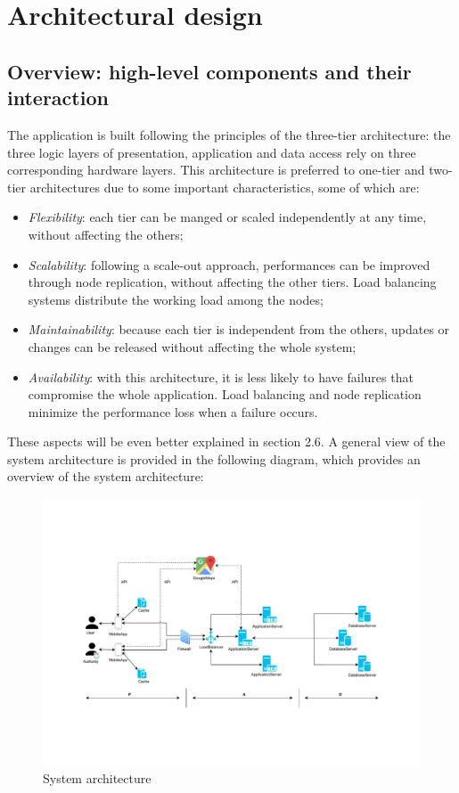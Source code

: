 \documentclass[12pt,a4paper]{report}
\begin{document}
	\chapter{Architectural design}
		\section{Overview:	high-level	components	and	their	interaction}
	The application is built following the principles of the three-tier architecture: the three logic layers of presentation, 				application and data access rely on three corresponding hardware layers. This architecture is preferred to one-tier and 			two-tier architectures due to some important characteristics, some of which are:
	\begin{itemize}
	\item \emph{Flexibility}: each tier can be manged or scaled independently at any time, without affecting the others;
	\item \emph{Scalability}: following a scale-out approach, performances can be improved through node replication, without affecting the other tiers.
	Load balancing systems distribute the working load among the nodes;
	\item \emph{Maintainability}: because each tier is independent from the others, updates or changes can be released
	without affecting the whole system;
	\item \emph{Availability}: with this architecture, it is less likely to have failures that compromise the whole application.
	Load balancing and node replication minimize the performance loss when a failure occurs.
	\end{itemize}
	These aspects will be even better explained in section 2.6.
	A general view of the system architecture is provided in the following diagram, which provides an overview of the system architecture:
	\begin{figure}[H]
			\includegraphics[scale = 0.6, center]{sysarch}
			\caption{System architecture}
	\end{figure}
\end{document}
